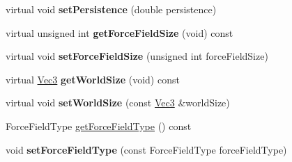 \begin{DoxyCompactItemize}
\item 
\mbox{\label{classPUForceField_a972c368897868323974d2231fdc3af4b}} 
virtual void {\bfseries set\+Persistence} (double persistence)
\item 
\mbox{\label{classPUForceField_aaf8a5a41e9c2c3297d6df168e18a15e2}} 
virtual unsigned int {\bfseries get\+Force\+Field\+Size} (void) const
\item 
\mbox{\label{classPUForceField_a253797c3463e09c82bacdf3387f3a6da}} 
virtual void {\bfseries set\+Force\+Field\+Size} (unsigned int force\+Field\+Size)
\item 
\mbox{\label{classPUForceField_a270ef76861c0639f57a18d23efe0de05}} 
virtual \hyperlink{classVec3}{Vec3} {\bfseries get\+World\+Size} (void) const
\item 
\mbox{\label{classPUForceField_abb1cdf901ad7977e1a9fd99c4c32be32}} 
virtual void {\bfseries set\+World\+Size} (const \hyperlink{classVec3}{Vec3} \&world\+Size)
\item 
Force\+Field\+Type \hyperlink{classPUForceField_a0768666fc2138a381104b19f3be4e986}{get\+Force\+Field\+Type} () const
\item 
\mbox{\label{classPUForceField_a512325199291409005495a6729048a83}} 
void {\bfseries set\+Force\+Field\+Type} (const Force\+Field\+Type force\+Field\+Type)
\end{DoxyCompactItemize}
